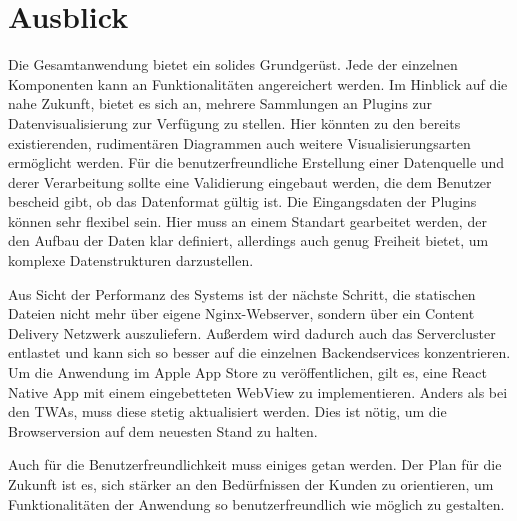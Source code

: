 \chapter{Ausblick}
\label{chap:ausblick}

Die Gesamtanwendung bietet ein solides Grundgerüst. Jede der einzelnen Komponenten
kann an Funktionalitäten angereichert werden. Im Hinblick auf die nahe Zukunft, bietet es sich an,
mehrere Sammlungen an Plugins zur Datenvisualisierung zur Verfügung zu stellen. Hier könnten
zu den bereits existierenden, rudimentären Diagrammen auch weitere Visualisierungsarten ermöglicht
werden. Für die benutzerfreundliche Erstellung einer Datenquelle und derer Verarbeitung
sollte eine Validierung eingebaut werden, die dem Benutzer bescheid gibt, ob das Datenformat
gültig ist. Die Eingangsdaten der Plugins können sehr flexibel sein. Hier muss an einem Standart
gearbeitet werden, der den Aufbau der Daten klar definiert, allerdings auch genug Freiheit bietet,
um komplexe Datenstrukturen darzustellen.

Aus Sicht der Performanz des Systems ist der nächste
Schritt, die statischen Dateien nicht mehr über eigene Nginx-Webserver, sondern über ein
Content Delivery Netzwerk auszuliefern. Außerdem wird dadurch auch das Servercluster
entlastet und kann sich so besser auf die einzelnen Backendservices konzentrieren.
Um die Anwendung im Apple App Store zu veröffentlichen, gilt es, eine React Native
App mit einem eingebetteten WebView zu implementieren. Anders als bei den TWAs, muss
diese stetig aktualisiert werden. Dies ist nötig, um die Browserversion auf
dem neuesten Stand zu halten. 

Auch für die Benutzerfreundlichkeit muss einiges getan werden. 
Der Plan für die Zukunft ist es, sich stärker an den Bedürfnissen der Kunden zu orientieren,
um Funktionalitäten der Anwendung so benutzerfreundlich wie möglich zu gestalten.


